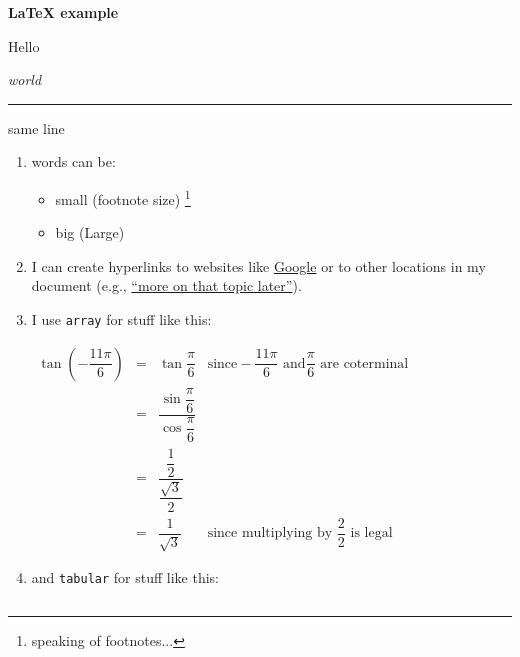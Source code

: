 \documentclass[10pt]{article}
\begin{document}
\begin{center}
    \textbf{\LaTeX{} example}
\end{center}
Hello
\begin{flushright}
    \textit{world}
    \hrule
\end{flushright}
same \hfill line

\begin{enumerate}[(1)] %
    \item words can be:
          \begin{itemize}
              \item \footnotesize{small} (footnote size) \footnote{speaking of footnotes...}
              \item \large{big (Large)}
          \end{itemize}
    \item I can create hyperlinks to websites like \href{https://www.google.com/}{Google} or to other locations in my document (e.g., \hyperlink{a}{“more on that topic later”}).
    \item I use \texttt{array} for stuff like this:
          \begin{center}
            \renewcommand{\arraystretch}{2}
              $\begin{array}{llll} %
                      \tan{\left( - \dfrac{11 \pi}{6}\right)} & = & \tan{\dfrac{\pi}{6}}                             & \text{since} - \dfrac{11 \pi}{6} \text{ and} \dfrac{\pi}{6} \text{ are coterminal} \\[.8em]
                                                 & = & \dfrac{\sin{\dfrac{\pi}{6}}}{\cos{\dfrac{\pi}{6}}} &                                                                                  \\[.8em]
                                                 & = & \dfrac{\dfrac{1}{2}}{\dfrac{\sqrt{3}}{2}}          &                                                                                  \\[.8em]
                                                 & = & \dfrac{1}{\sqrt{3}}                              & \text{since multiplying by } \dfrac{2}{2} \text{ is legal}
                  \end{array}$
          \end{center}
    \item and \texttt{tabular} for stuff like this:
          \begin{center}
              \begin{tabular}{|l|c|r|}

\end{tabular}
\end{center}
\end{enumerate}
\end{document}

